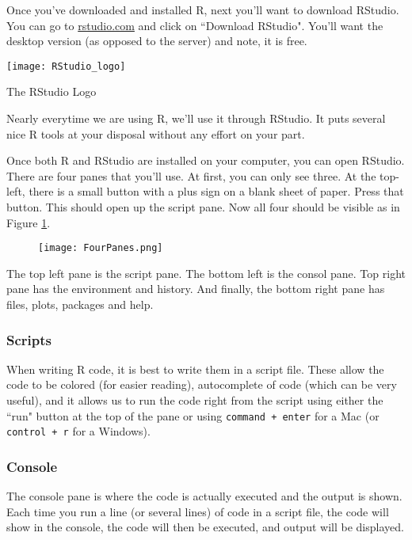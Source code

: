 \documentclass{book}
\begin{document}
Once you've downloaded and installed R, next you'll want to download RStudio. You can go to \href{https://www.rstudio.com/}{rstudio.com} and click on ``Download RStudio". You'll want the desktop version (as opposed to the server) and note, it is free. 
\begin{marginfigure}
  \texttt{[image: RStudio\_logo]}
  \caption*{The RStudio Logo}
  \label{fig_rstudiologo}
\end{marginfigure} 
Nearly everytime we are using R, we'll use it through RStudio.  It puts several nice R tools at your disposal without any effort on your part.

Once both R and RStudio are installed on your computer, you can open RStudio. There are four panes that you'll use. At first, you can only see three. At the top-left, there is a small button with a plus sign on a blank sheet of paper. Press that button. This should open up the script pane. Now all four should be visible as in Figure \ref{fig_fourpanes}.
\begin{figure}[htb]
  \hspace*{-.7in}
  \centerline{\texttt{[image: FourPanes.png]}}
  \label{fig_fourpanes}
\end{figure} 
The top left pane is the script pane. The bottom left is the consol pane. Top right pane has the environment and history. And finally, the bottom right pane has files, plots, packages and help.

\subsubsection*{Scripts}
When writing R code, it is best to write them in a script file. These allow the code to be colored (for easier reading), autocomplete of code (which can be very useful), and it allows us to run the code right from the script using either the ``run" button at the top of the pane or using \texttt{command + enter} for a Mac (or \texttt{control + r} for a Windows).


\subsubsection*{Console}
The console pane is where the code is actually executed and the output is shown. Each time you run a line (or several lines) of code in a script file, the code will show in the console, the code will then be executed, and output will be displayed.
\end{document}
